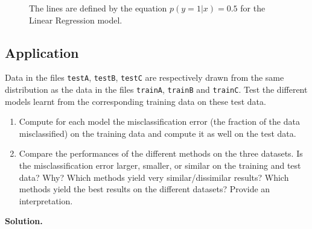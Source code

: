 \documentclass[a4paper, 11pt]{article}
\begin{document}
\begin{enumerate}[label=\alph*]
\begin{figure}[!htb]
          \label{fig:linreg_c}
        \endminipage
        \caption{The lines are defined by the equation $p(y=1|x)=0.5$ for the Linear Regression model.}
        \label{fig:lin-reg-plot}
        \end{figure}
\end{enumerate}

\subsection{Application}

Data in the files \texttt{testA}, \texttt{testB}, \texttt{testC} are respectively drawn from the same distribution as the data in the files \texttt{trainA}, \texttt{trainB} and \texttt{trainC}. Test the different models learnt from the corresponding training data on these test data.

\begin{enumerate}[label=\alph*]
    \item Compute for each model the misclassification error (\ie the fraction of the data misclassified) on the training data and compute it as well on the test data.
    
    \item Compare the performances of the different methods on the three datasets. Is the misclassification error larger, smaller, or similar on the training and test data? Why? Which methods yield very similar/dissimilar results? Which methods yield the best results on the different datasets? Provide an interpretation.
\end{enumerate}

\textbf{Solution.} \\
\end{document}
